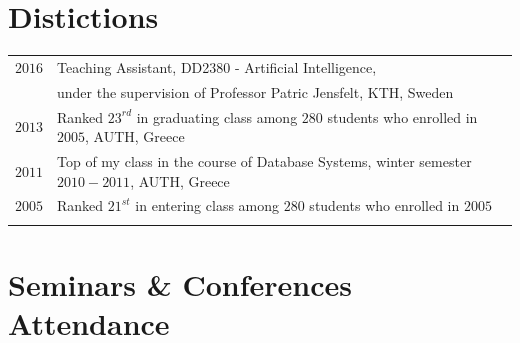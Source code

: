 \documentclass[a4paper,10pt,twoside]{article}
\begin{document}

\section{Distictions}
\begin{tabular}{rl}

  $2016$ & Teaching Assistant, DD2380 - Artificial Intelligence, \\ & under the
supervision of Professor Patric Jensfelt, KTH, Sweden \\


$2013$ & Ranked $23^{rd}$ in graduating class among $280$ students who enrolled in $2005$,
AUTH, Greece \\


$2011$ & Top of my class in the course of Database Systems, winter semester $2010 - 2011$,
AUTH, Greece \\


$2005$ & Ranked $21^{st}$ in entering class among $280$ students who enrolled in $2005$\\
&\\
\end{tabular}




\section{Seminars \& Conferences Attendance}
\end{document}
